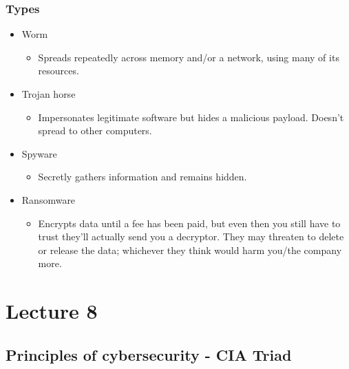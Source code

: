 \documentclass[12pt]{report}
\begin{document}
\subsection{Types}
\begin{itemize}
	\item Worm
	\begin{itemize}
		\item Spreads repeatedly across memory and/or a network, using many of its resources.
	\end{itemize}
	\item Trojan horse
	\begin{itemize}
		\item Impersonates legitimate software but hides a malicious payload. Doesn't spread to other computers. 
	\end{itemize}
	\item Spyware
	\begin{itemize}
		\item Secretly gathers information and remains hidden. 
	\end{itemize}
	\item Ransomware
	\begin{itemize}
		\item Encrypts data until a fee has been paid, but even then you still have to trust they'll actually send you a decryptor. They may threaten to delete or release the data; whichever they think would harm you/the company more. 
	\end{itemize}
\end{itemize}

\chapter{Lecture 8}
\section{Principles of cybersecurity - \textbf{CIA Triad}}
\end{document}
